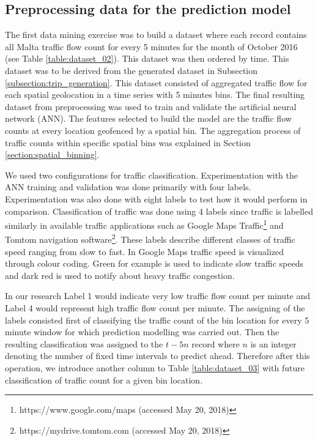 \documentclass[12pt, a4paper]{report}
\theoremstyle{definition}
\theoremstyle{definition}%
\theoremstyle{definition}%
\theoremstyle{definition}%
\theoremstyle{definition}%
\theoremstyle{definition}%
\begin{document}
\subsection{Preprocessing data for the prediction model} \label{subsection:Preprocessing data for the prediction model}
The first data mining exercise was to build a dataset where each record contains all Malta traffic flow count for every 5 minutes for the month of October 2016 (see Table \ref{table:dataset_02}). This dataset was then ordered by time. This dataset was to be derived from the generated dataset in Subsection \ref{subsection:trip_generation}. This dataset consisted of aggregated traffic flow for each spatial geolocation in a time series with 5 minutes bins. The final resulting dataset from preprocessing was used to train and validate the artificial neural network (ANN). The features selected to build the model are the traffic flow counts at every location geofenced by a spatial bin. The aggregation process of traffic counts within specific spatial bins was explained in Section \ref{section:spatial_binning}.

We used two configurations for traffic classification. Experimentation with the ANN training and validation was done primarily with four labels. Experimentation was also done with eight labels to test how it would perform in comparison. Classification of traffic was done using 4 labels since traffic is labelled similarly in available traffic applications such as Google Maps Traffic\footnote{https://www.google.com/maps (accessed May 20, 2018)} and Tomtom navigation software\footnote{https://mydrive.tomtom.com (accessed May 20, 2018)}. These labels describe different classes of traffic speed ranging from slow to fast. In Google Maps traffic speed is visualized through colour coding. Green for example is used to indicate slow traffic speeds and dark red is used to notify about heavy traffic congestion.  

In our research Label 1 would indicate very low traffic flow count per minute and Label 4 would represent high traffic flow count per minute. The assigning of the labels consisted first of classifying the traffic count of the bin location for every 5 minute window for which prediction modelling was carried out.  Then the resulting classification was assigned to the $t - 5n$ record where $n$ is an integer denoting the number of fixed time intervals to predict ahead. Therefore after this operation, we introduce another column to Table \ref{table:dataset_03} with future classification of traffic count for a given bin location. 
\end{document}
